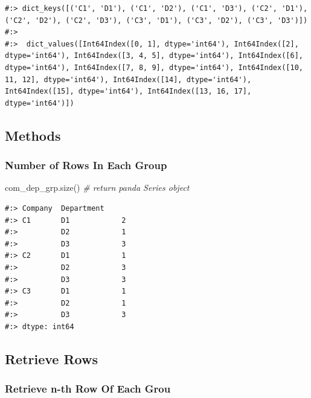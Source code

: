 \documentclass[
]{book}
\newenvironment{Shaded}{\begin{snugshade}}{\end{snugshade}}
\newcommand{\CommentTok}[1]{\textcolor[rgb]{0.37,0.37,0.37}{\textit{#1}}}
\newcommand{\NormalTok}[1]{#1}
\begin{document}
\begin{verbatim}
#:> dict_keys([('C1', 'D1'), ('C1', 'D2'), ('C1', 'D3'), ('C2', 'D1'), ('C2', 'D2'), ('C2', 'D3'), ('C3', 'D1'), ('C3', 'D2'), ('C3', 'D3')]) 
#:> 
#:>  dict_values([Int64Index([0, 1], dtype='int64'), Int64Index([2], dtype='int64'), Int64Index([3, 4, 5], dtype='int64'), Int64Index([6], dtype='int64'), Int64Index([7, 8, 9], dtype='int64'), Int64Index([10, 11, 12], dtype='int64'), Int64Index([14], dtype='int64'), Int64Index([15], dtype='int64'), Int64Index([13, 16, 17], dtype='int64')])
\end{verbatim}

\hypertarget{methods-1}{%
\subsection{Methods}\label{methods-1}}

\hypertarget{number-of-rows-in-each-group}{%
\subsubsection{Number of Rows In Each Group}\label{number-of-rows-in-each-group}}

\begin{Shaded}
\begin{Highlighting}[]
\NormalTok{com_dep_grp.size()  }\CommentTok{# return panda Series object}
\end{Highlighting}
\end{Shaded}

\begin{verbatim}
#:> Company  Department
#:> C1       D1            2
#:>          D2            1
#:>          D3            3
#:> C2       D1            1
#:>          D2            3
#:>          D3            3
#:> C3       D1            1
#:>          D2            1
#:>          D3            3
#:> dtype: int64
\end{verbatim}

\hypertarget{retrieve-rows}{%
\subsection{Retrieve Rows}\label{retrieve-rows}}

\hypertarget{retrieve-n-th-row-of-each-grou}{%
\subsubsection{Retrieve n-th Row Of Each Grou}\label{retrieve-n-th-row-of-each-grou}}
\end{document}
